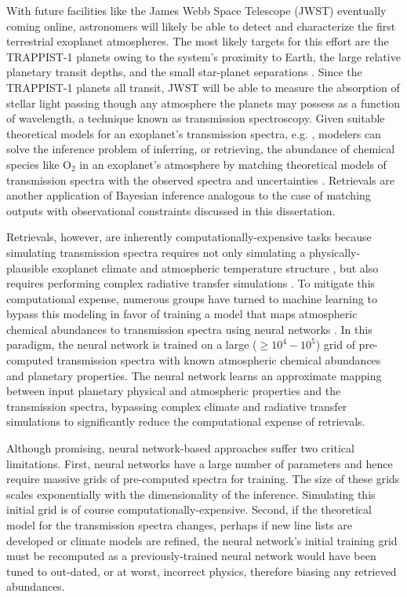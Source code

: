 With future facilities like the James Webb Space Telescope (JWST) eventually coming online, astronomers will likely be able to detect and characterize the first terrestrial exoplanet atmospheres. The most likely targets for this effort are the TRAPPIST-1 planets owing to the system's proximity to Earth, the large relative planetary transit depths, and the small star-planet separations \citep{Gillon2016,Gillon2017,Morley2017,Lustig2019}. Since the TRAPPIST-1 planets all transit, JWST will be able to measure the absorption of stellar light passing though any atmosphere the planets may possess as a function of wavelength, a technique known as transmission spectroscopy. Given suitable theoretical models for an exoplanet's transmission spectra, e.g. \citet{Lincowski2018}, modelers can solve the inference problem of inferring, or retrieving, the abundance of chemical species like O$_2$ in an exoplanet's atmosphere by matching theoretical models of transmission spectra with the observed spectra and uncertainties \citep[e.g.][]{KrissansenTotton2018,Tremblay2020}. Retrievals are another application of Bayesian inference analogous to the case of matching \vplanet outputs with observational constraints discussed in this dissertation.

Retrievals, however, are inherently computationally-expensive tasks because simulating transmission spectra requires not only simulating a physically-plausible exoplanet climate and atmospheric temperature structure \citep{Lincowski2018}, but also requires performing complex radiative transfer simulations \citep[e.g. with SMART, ][]{Meadows1996,Crisp1997}. To mitigate this computational expense, numerous groups have turned to machine learning to bypass this modeling in favor of training a model that maps atmospheric chemical abundances to transmission spectra using neural networks \citep{Waldmann2016,MarquezNeila2018,Zingales2018,Cobb2019,Fisher2019,Himes2020}. In this paradigm, the neural network is trained on a large ($\geq 10^4-10^5$) grid of pre-computed transmission spectra with known atmospheric chemical abundances and planetary properties. The neural network learns an approximate mapping between input planetary physical and atmospheric properties and the transmission spectra, bypassing complex climate and radiative transfer simulations to significantly reduce the computational expense of retrievals.

Although promising, neural network-based approaches suffer two critical limitations. First, neural networks have a large number of parameters and hence require massive grids of pre-computed spectra for training. The size of these grids scales exponentially with the dimensionality of the inference. Simulating this initial grid is of course computationally-expensive. Second, if the theoretical model for the transmission spectra changes, perhaps if new line lists are developed or climate models are refined, the neural network's initial training grid must be recomputed as a previously-trained neural network would have been tuned to out-dated, or at worst, incorrect physics, therefore biasing any retrieved abundances. 

